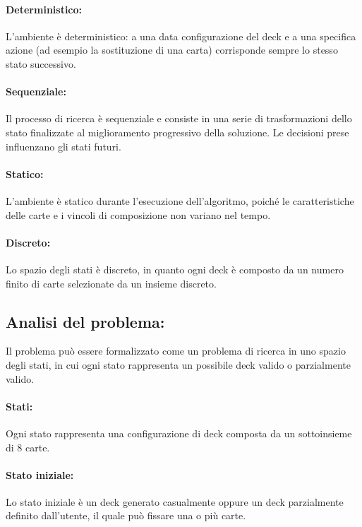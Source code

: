 \documentclass{article}
\begin{document}
\paragraph{Deterministico:}
L’ambiente è deterministico: a una data configurazione del deck e a una specifica azione (ad esempio la sostituzione di una carta) corrisponde sempre lo stesso stato successivo.

\paragraph{Sequenziale:}
Il processo di ricerca è sequenziale e consiste in una serie di trasformazioni dello stato finalizzate al miglioramento progressivo della soluzione. Le decisioni prese influenzano gli stati futuri.

\paragraph{Statico:}
L’ambiente è statico durante l’esecuzione dell’algoritmo, poiché le caratteristiche delle carte e i vincoli di composizione non variano nel tempo.

\paragraph{Discreto:}
Lo spazio degli stati è discreto, in quanto ogni deck è composto da un numero finito di carte selezionate da un insieme discreto.

\subsection{Analisi del problema:}

Il problema può essere formalizzato come un problema di ricerca in uno spazio degli stati, in cui ogni stato rappresenta un possibile deck valido o parzialmente valido.

\paragraph{Stati:}
Ogni stato rappresenta una configurazione di deck composta da un sottoinsieme di 8 carte.

\paragraph{Stato iniziale:}
Lo stato iniziale è un deck generato casualmente oppure un deck parzialmente definito dall’utente, il quale può fissare una o più carte.
\end{document}
